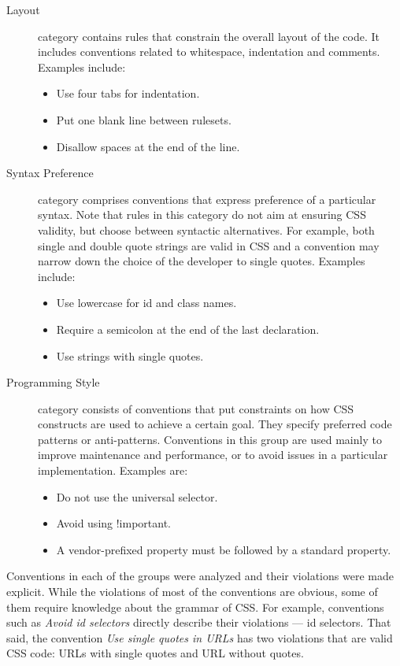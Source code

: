 \begin{description}
  \item[Layout] category contains rules that constrain the overall layout of the code. It includes conventions related to whitespace, indentation and comments. Examples include:
  \begin{itemize}
  \item Use four tabs for indentation.
  \item Put one blank line between rulesets.
  \item Disallow spaces at the end of the line.
  \end{itemize}
  \item[Syntax Preference] category comprises conventions that express preference of a particular syntax. Note that rules in this category do not aim at ensuring CSS validity, but choose between syntactic alternatives. For example, both single and double quote strings are valid in CSS and a convention may narrow down the choice of the developer to single quotes. Examples include:
  \begin{itemize}
  \item Use lowercase for id and class names.
  \item Require a semicolon at the end of the last declaration.
  \item Use strings with single quotes.
  \end{itemize}
  \item[Programming Style] category consists of conventions that put constraints on how CSS constructs are used to achieve a certain goal. They specify preferred code patterns or anti-patterns. Conventions in this group are used mainly to improve maintenance and performance, or to avoid issues in a particular implementation. Examples are:
  \begin{itemize}
  \item Do not use the universal selector.
  \item Avoid using !important.
  \item A vendor-prefixed property must be followed by a standard property.
  \end{itemize}
\end{description}

Conventions in each of the groups were analyzed and their violations were made
explicit. While the violations of most of the conventions are obvious, some of
them require knowledge about the grammar of CSS. For example, conventions such
as \textit{Avoid id selectors} directly describe their violations --- id
selectors. That said, the convention \textit{Use single quotes in URLs} has
two violations that are valid CSS code: URLs with single quotes and URL
without quotes.

